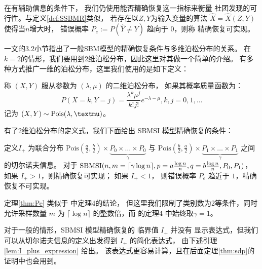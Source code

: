  在有辅助信息的条件下，
 我们仍使用能否精确恢复这一指标来衡量
 社团发现的可行性。与定义\ref{def:SSBMR}类似，
 若存在以$Z,Y$为输入变量的算法 $\hat{X}=\hat{X}(Z,Y)$
 使得当$n$增大时，
 错误概率
 $P_e:=P(\hat{Y} \neq Y)$ 趋向于 $0$，则称
 精确恢复可实现。

 \citet{abbe2015community}一文的3.2小节指出了一般SBM模型的精确恢复条件与多维泊松分布的关系。
在$k=2$的情形，我们要用到2维泊松分布，因此这里对其做一个简单的介绍。
有多种方式推广一维的泊松分布，这里我们使用的是如下定义：

\begin{definition}
    称 $(X,Y)$ 服从参数为 $(\lambda, \mu)$ 的二维泊松分布，
    如果其概率质量函数为：
    \begin{equation}
        P(X=k, Y=j) = \frac{\lambda^k \mu^j}{k! j!}
        e^{-\lambda - \mu}, k,j=0,1,\dots
    \end{equation}
    记为 $(X,Y) \sim \Pois(\lambda, \mu)$。
\end{definition}

有了2维泊松分布的定义式，我们下面给出
SBMSI 模型精确恢复的条件：
\begin{theorem}\label{thm:Pe}
    定义$I_+$ 为联合分布 $\textrm{Pois}(\frac{a}{2},\frac{b}{2})\times \underbrace{P_0 \times \dots \times P_0}_{\gamma}$
    与 $\textrm{Pois}(\frac{b}{2}, \frac{a}{2})\times \underbrace{P_1 \times \dots \times P_1}_{\gamma}$ 
    之间的切尔诺夫信息。    
    对于 $\operatorname{SBMSI}(n,m=\lceil \gamma \log n \rceil, p=a\frac{\log n}{n},q=b\frac{\log n}{n},P_0,P_1)$，
    如果 $I_+>1$，则精确恢复可实现；
    如果 $I_+ < 1$，
    则错误概率 $P_e$ 趋近于 $1$，精确恢复不可实现。
\end{theorem}

定理\ref{thm:Pe} 类似于 \citet{abbe17sideinfo} 中定理4的结论，
但这里我们限制了类别数为2等条件，同时允许采样数量 $m$ 为
$\lceil \log n \rceil $ 的整数倍，而 \citet{abbe17sideinfo} 的定理4
中始终取$\gamma=1$。

对于一般的情形，SBMSI 模型精确恢复的 临界值 $I_+$ 并没有
显示表达式，但我们可以从切尔诺夫信息的定义出发得到 $I_+$ 的简化表达式，
由下述引理\ref{lem:I_plus_expression} 给出。
该表达式更容易计算，且在后面定理\ref{thm:sdp}的证明中也会用到。

